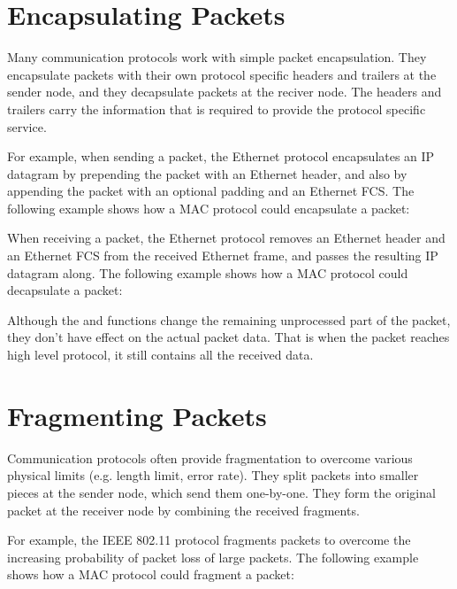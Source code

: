 
\section{Encapsulating Packets}

Many communication protocols work with simple packet encapsulation. They
encapsulate packets with their own protocol specific headers and trailers at the
sender node, and they decapsulate packets at the reciver node. The headers and
trailers carry the information that is required to provide the protocol specific
service.

For example, when sending a packet, the Ethernet protocol encapsulates an IP
datagram by prepending the packet with an Ethernet header, and also by appending
the packet with an optional padding and an Ethernet FCS. The following example
shows how a MAC protocol could encapsulate a packet:


When receiving a packet, the Ethernet protocol removes an Ethernet header and an
Ethernet FCS from the received Ethernet frame, and passes the resulting IP
datagram along. The following example shows how a MAC protocol could decapsulate
a packet:


Although the  and  functions change the
remaining unprocessed part of the packet, they don't have effect on the actual
packet data. That is when the packet reaches high level protocol, it still
contains all the received data.

\section{Fragmenting Packets}

Communication protocols often provide fragmentation to overcome various physical
limits (e.g. length limit, error rate). They split packets into smaller pieces
at the sender node, which send them one-by-one. They form the original packet at
the receiver node by combining the received fragments.

For example, the IEEE 802.11 protocol fragments packets to overcome the
increasing probability of packet loss of large packets. The following example
shows how a MAC protocol could fragment a packet:

